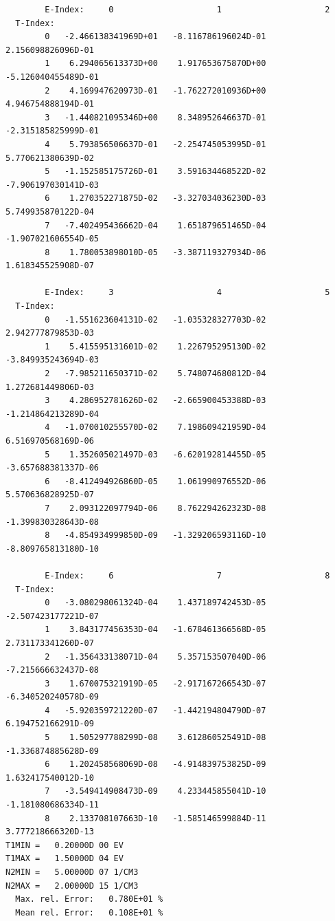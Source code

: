 \documentclass[12pt,dvipdfmx]{article}
\begin{document}
\begin{small}\begin{verbatim}
        E-Index:     0                     1                     2
  T-Index:
        0   -2.466138341969D+01   -8.116786196024D-01    2.156098826096D-01
        1    6.294065613373D+00    1.917653675870D+00   -5.126040455489D-01
        2    4.169947620973D-01   -1.762272010936D+00    4.946754888194D-01
        3   -1.440821095346D+00    8.348952646637D-01   -2.315185825999D-01
        4    5.793856506637D-01   -2.254745053995D-01    5.770621380639D-02
        5   -1.152585175726D-01    3.591634468522D-02   -7.906197030141D-03
        6    1.270352271875D-02   -3.327034036230D-03    5.749935870122D-04
        7   -7.402495436662D-04    1.651879651465D-04   -1.907021606554D-05
        8    1.780053898010D-05   -3.387119327934D-06    1.618345525908D-07

        E-Index:     3                     4                     5
  T-Index:
        0   -1.551623604131D-02   -1.035328327703D-02    2.942777879853D-03
        1    5.415595131601D-02    1.226795295130D-02   -3.849935243694D-03
        2   -7.985211650371D-02    5.748074680812D-04    1.272681449806D-03
        3    4.286952781626D-02   -2.665900453388D-03   -1.214864213289D-04
        4   -1.070010255570D-02    7.198609421959D-04    6.516970568169D-06
        5    1.352605021497D-03   -6.620192814455D-05   -3.657688381337D-06
        6   -8.412494926860D-05    1.061990976552D-06    5.570636828925D-07
        7    2.093122097794D-06    8.762294262323D-08   -1.399830328643D-08
        8   -4.854934999850D-09   -1.329206593116D-10   -8.809765813180D-10

        E-Index:     6                     7                     8
  T-Index:
        0   -3.080298061324D-04    1.437189742453D-05   -2.507423177221D-07
        1    3.843177456353D-04   -1.678461366568D-05    2.731173341260D-07
        2   -1.356433138071D-04    5.357153507040D-06   -7.215666632437D-08
        3    1.670075321919D-05   -2.917167266543D-07   -6.340520240578D-09
        4   -5.920359721220D-07   -1.442194804790D-07    6.194752166291D-09
        5    1.505297788299D-08    3.612860525491D-08   -1.336874885628D-09
        6    1.202458568069D-08   -4.914839753825D-09    1.632417540012D-10
        7   -3.549414908473D-09    4.233445855041D-10   -1.181080686334D-11
        8    2.133708107663D-10   -1.585146599884D-11    3.777218666320D-13
T1MIN =   0.20000D 00 EV
T1MAX =   1.50000D 04 EV
N2MIN =   5.00000D 07 1/CM3
N2MAX =   2.00000D 15 1/CM3
  Max. rel. Error:   0.780E+01 %
  Mean rel. Error:   0.108E+01 %
\end{verbatim}\end{small}
\end{document}

